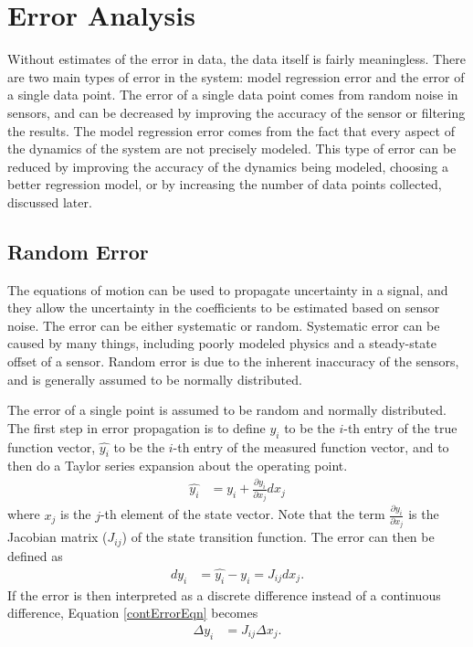 \section{Error Analysis}
Without estimates of the error in data, the data itself is fairly meaningless. There are two main types of error in the system: model regression error and the error of a single data point. The error of a single data point comes from random noise in sensors, and can be decreased by improving the accuracy of the sensor or filtering the results. The model regression error comes from the fact that every aspect of the dynamics of the system are not precisely modeled. This type of error can be reduced by improving the accuracy of the dynamics being modeled, choosing a better regression model, or by increasing the number of data points collected, discussed later.
\subsection*{Random Error}
\label{pointErrorSection}
 The equations of motion can be used to propagate uncertainty in a signal, and they allow the uncertainty in the coefficients to be estimated based on sensor noise. The error can be either systematic or random. Systematic error can be caused by many things, including poorly modeled physics and a steady-state offset of a sensor. Random error is due to the inherent inaccuracy of the sensors, and is generally assumed to be normally distributed.

The error of a single point is assumed to be random and normally distributed. The first step in error propagation is to define $y_i$ to be the $i$-th entry of the true function vector, $\hat{y_i}$ to be the $i$-th entry of the measured function vector, and to then do a Taylor series expansion about the operating point.
\begin{align}
\hat{y_i} &= y_i + \frac{\partial{y_i}}{\partial{x_j}}dx_j
\end{align}
\noindent
where $x_j$ is the $j$-th element of the state vector. Note that the term $\frac{\partial{y_i}}{\partial{x_j}}$ is the Jacobian matrix ($J_{ij}$) of the state transition function. The error can then be defined as
\begin{align}
\label{contErrorEqn}
dy_i &= \hat{y_i}-y_i =  J_{ij}dx_j.
\end{align}
If the error is then interpreted as a discrete difference instead of a continuous difference, Equation \ref{contErrorEqn} becomes
\begin{align}
\label{errorEqn}
\Delta y_i &= J_{ij}\Delta x_j.
\end{align}

